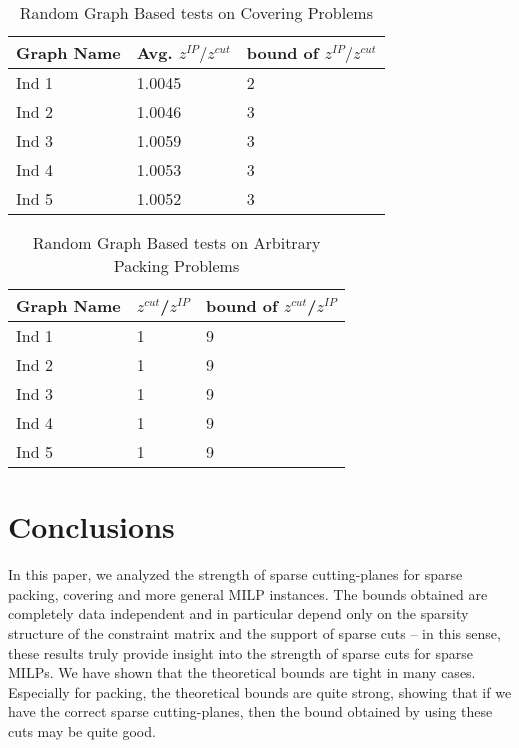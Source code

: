 \documentclass[smallextended]{svjour3}
\begin{document}
\begin{table}[H]
\centering \caption{Random Graph Based tests on Covering Problems} \label{tab:c5}
\begin{tabular}{|l|l|l|}
\hline Graph Name & Avg. $z^{IP}/z^{cut}$ & bound of  $z^{IP}/z^{cut}$ \\
\hline Ind 1 & 1.0045     & 2                 \\
\hline Ind 2      & 1.0046 & 3                 \\
\hline Ind 3      & 1.0059     & 3\\
\hline Ind 4      & 1.0053     & 3                 \\
\hline Ind 5      & 1.0052     & 3                 \\
\hline
\end{tabular}
\end{table}
\begin{table}[H]
\centering \caption{Random Graph Based tests on Arbitrary Packing Problems}
\label{tab:c6}
\begin{tabular}{|l|l|l|}
\hline Graph Name & $z^{cut}$/$z^{IP}$ & bound of $z^{cut}$/$z^{IP}$ \\ \hline Ind 1
& 1     & 9               \\ \hline Ind 2      & 1
& 9             \\ \hline Ind 3      & 1    & 9
\\ \hline Ind 4      & 1     & 9              \\ \hline
Ind 5      & 1     & 9                \\ \hline
\end{tabular}
\end{table}

\section{Conclusions}\label{sec:conclusion}

In this paper, we analyzed the strength of sparse cutting-planes for sparse packing, covering and more general MILP instances. The bounds obtained are completely data independent and in particular depend only on the sparsity structure of the constraint matrix and the support of sparse cuts -- in this sense, these results truly provide insight into the strength of sparse cuts for sparse MILPs. We have shown that the theoretical bounds are tight in many cases. Especially for packing, the theoretical bounds are quite strong, showing that if we have the correct sparse cutting-planes, then the bound obtained by using these cuts may be quite good. 
\end{document}
